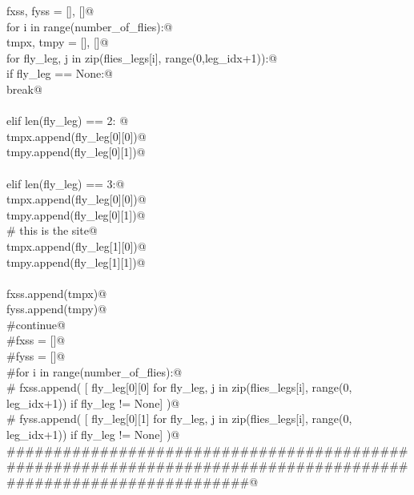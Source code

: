 \documentclass[11.5pt]{report}
\begin{document}
\begin{flushleft}
\begin{minipage}{\linewidth}
\begin{list}{}{}
\mbox{}\verb@     fxss, fyss = [], []@\\
\mbox{}\verb@     for i in range(number_of_flies):@\\
\mbox{}\verb@         tmpx, tmpy = [], []@\\
\mbox{}\verb@         for fly_leg, j in zip(flies_legs[i], range(0,leg_idx+1)):@\\
\mbox{}\verb@              if fly_leg == None:@\\
\mbox{}\verb@                   break@\\
\mbox{}\verb@@\\
\mbox{}\verb@              elif len(fly_leg) == 2: @\\
\mbox{}\verb@                   tmpx.append(fly_leg[0][0])@\\
\mbox{}\verb@                   tmpy.append(fly_leg[0][1])@\\
\mbox{}\verb@@\\
\mbox{}\verb@              elif len(fly_leg) == 3:@\\
\mbox{}\verb@                   tmpx.append(fly_leg[0][0])@\\
\mbox{}\verb@                   tmpy.append(fly_leg[0][1])@\\
\mbox{}\verb@                   # this is the site@\\
\mbox{}\verb@                   tmpx.append(fly_leg[1][0])@\\
\mbox{}\verb@                   tmpy.append(fly_leg[1][1])@\\
\mbox{}\verb@@\\
\mbox{}\verb@         fxss.append(tmpx)@\\
\mbox{}\verb@         fyss.append(tmpy)@\\
\mbox{}\verb@     #continue@\\
\mbox{}\verb@     #fxss = []@\\
\mbox{}\verb@     #fyss = []@\\
\mbox{}\verb@     #for i in range(number_of_flies):@\\
\mbox{}\verb@     #   fxss.append( [ fly_leg[0][0] for fly_leg, j in zip(flies_legs[i], range(0, leg_idx+1)) if fly_leg != None] )@\\
\mbox{}\verb@     #   fyss.append( [ fly_leg[0][1] for fly_leg, j in zip(flies_legs[i], range(0, leg_idx+1)) if fly_leg != None] )@\\
\mbox{}\verb@     ################################################################################################################@\\

\end{list}
\end{minipage}
\end{flushleft}
\end{document}
